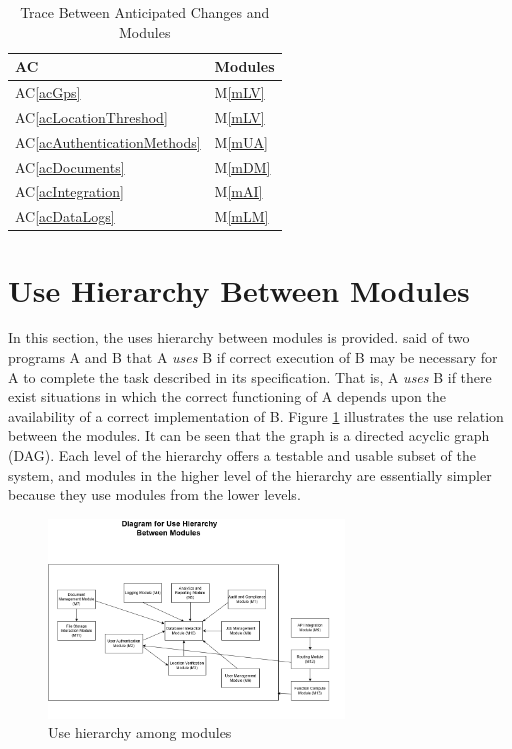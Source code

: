 \documentclass[12pt, titlepage]{article}
\newcommand{\acref}[1]{AC\ref{#1}}
\newcommand{\mref}[1]{M\ref{#1}}
\begin{document}
\begin{table}[H]
  \centering
  \begin{tabular}{p{} p{}}
    \toprule
    \textbf{AC}                        & \textbf{Modules} \\
    \midrule
    \acref{acGps}                      & \mref{mLV} \\
    \acref{acLocationThreshod}         & \mref{mLV} \\
    \acref{acAuthenticationMethods}    & \mref{mUA} \\
    \acref{acDocuments}                & \mref{mDM} \\
    \acref{acIntegration}              & \mref{mAI} \\
    \acref{acDataLogs}                 & \mref{mLM} \\
    \bottomrule
  \end{tabular}
  \caption{Trace Between Anticipated Changes and Modules}
  \label{TblACT}
\end{table}

\section{Use Hierarchy Between Modules} \label{SecUse}

In this section, the uses hierarchy between modules is
provided. \citet{Parnas1978} said of two programs A and B that A {\em uses} B if
correct execution of B may be necessary for A to complete the task described in
its specification. That is, A {\em uses} B if there exist situations in which
the correct functioning of A depends upon the availability of a correct
implementation of B.  Figure \ref{FigUH} illustrates the use relation between
the modules. It can be seen that the graph is a directed acyclic graph
(DAG). Each level of the hierarchy offers a testable and usable subset of the
system, and modules in the higher level of the hierarchy are essentially simpler
because they use modules from the lower levels.

\begin{figure}[H]
  \centering
  \includegraphics[width=0.7\textwidth]{userHierarchy.png}
  \caption{Use hierarchy among modules}
  \label{FigUH}
\end{figure}
\end{document}
